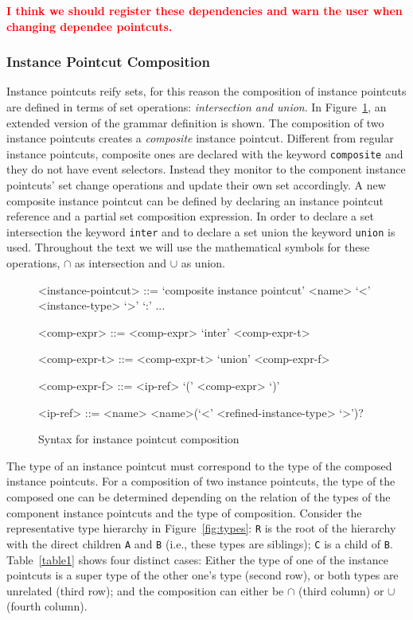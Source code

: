 \documentclass{acm_proc_article-sp}
\newcommand{\todok}[1]{\textcolor{red}{\textbf{#1}}}
\newcommand{\lstinln}[1]{\lstinline~#1~}
\begin{document}
\todok{I think we should register these dependencies and warn the user when changing dependee pointcuts. }

\subsubsection{Instance Pointcut Composition}

Instance pointcuts reify sets, for this reason the composition of instance pointcuts are defined in terms of set operations: \emph{intersection and union}. 
In Figure~\ref{fig:grammar2}, an extended version of the grammar definition is shown. 
The composition of two instance pointcuts creates a \emph{composite} instance pointcut. Different from regular instance pointcuts, composite ones are declared with the keyword \lstinln{composite} and they do not have event selectors. Instead they monitor to the component instance pointcuts' set change operations and update their own set accordingly. 
A new composite instance pointcut can be defined by declaring an instance pointcut reference and a partial set composition expression.  In order to declare a set intersection the keyword \lstinln{inter} and to declare a set union the keyword \lstinln{union} is used. Throughout the text we will use the mathematical symbols for these operations, $\cap$ as intersection and $\cup$ as union.

\begin{figure}[h]
\begin{grammar}
<instance-pointcut> ::= `composite instance pointcut' <name> `<' <instance-type> `>' `:'
... 

<comp-expr> ::= <comp-expr> `inter' <comp-expr-t>  

<comp-expr-t> ::= <comp-expr-t> `union' <comp-expr-f>  

<comp-expr-f> ::= <ip-ref> \alt `(' <comp-expr> `)'

<ip-ref> ::= <name> \alt <name>(`<' <refined-instance-type> `>')?

\end{grammar}
\caption{Syntax for instance pointcut composition}
\label{fig:grammar2}
\end{figure}



The type of an instance pointcut must correspond to the type of the composed instance pointcuts. For a composition of two instance pointcuts, the type of the composed one can be determined depending on the relation of the types of the component instance pointcuts and the type of composition. Consider the representative type hierarchy in Figure~\ref{fig:types}: \lstinln{R} is the root of the hierarchy with the direct children \lstinln{A} and \lstinln{B} (i.e., these types are siblings); \lstinln{C} is a child of \lstinln{B}. Table~\ref{table1} shows four distinct cases: Either the type of one of the instance pointcuts is a super type of the other one's type (second row), or both types are unrelated (third row); and the composition can either be $\cap$ (third column) or $\cup$ (fourth column).
\end{document}
